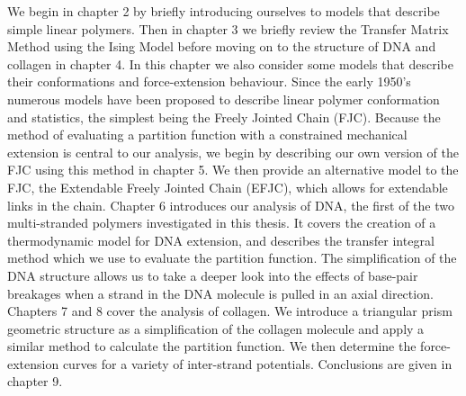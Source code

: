 We begin in chapter 2 by briefly introducing ourselves to models that describe simple linear polymers. Then in chapter 3 we briefly review the Transfer Matrix Method using the Ising Model before moving on to the structure of DNA and collagen in chapter 4. In this chapter we also consider some models that describe their conformations and force-extension behaviour. Since the early 1950's numerous models have been proposed to describe linear polymer conformation and statistics, the simplest being the Freely Jointed Chain (FJC). Because the method of evaluating a partition function with a constrained mechanical extension is central to our analysis, we begin by describing our own version of the FJC using this method in chapter 5. We then provide an alternative model to the FJC, the Extendable Freely Jointed Chain (EFJC), which allows for extendable links in the chain. Chapter 6 introduces our analysis of DNA, the first of the two multi-stranded polymers investigated in this thesis. It covers the creation of a thermodynamic model for DNA extension, and describes the transfer integral method which we use to evaluate the partition function. The simplification of the DNA structure allows us to take a deeper look into the effects of base-pair breakages when a strand in the DNA molecule is pulled in an axial direction. Chapters 7 and 8 cover the analysis of collagen. We introduce a triangular prism geometric structure as a simplification of the collagen molecule and apply a similar method to calculate the partition function. We then determine the force-extension curves for a variety of inter-strand potentials. Conclusions are given in chapter 9.
